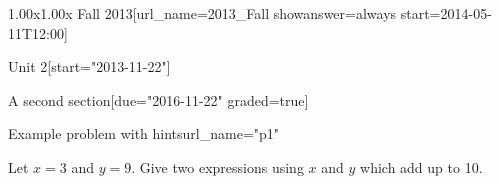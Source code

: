 \documentclass[12pt]{article}
\begin{document}
\begin{edXcourse}{1.00x}{1.00x Fall 2013}[url_name=2013_Fall showanswer=always start=2014-05-11T12:00]
\begin{edXchapter}{Unit 2}[start="2013-11-22"]
\begin{edXsection}{A second section}[due="2016-11-22" graded=true]
\begin{edXproblem}{Example problem with hints}{url_name="p1"}
 
Let $x=3$ and $y=9$.  Give two expressions using $x$ and $y$ which add
up to 10.




\end{edXproblem}


\end{edXsection}
\end{edXchapter}
\end{edXcourse}

\end{document}

